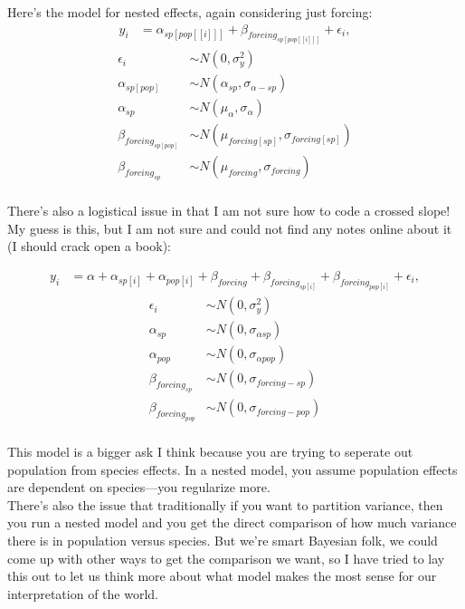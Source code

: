 \documentclass[11pt,letter]{article}
\begin{document}
Here's the model for nested effects, again considering just forcing:
\begin{align*}
y_i &= \alpha_{sp[pop[[i]]]} + \beta_{forcing_{sp[pop[[i]]]}}  + \epsilon_i,
\end{align*}
\begin{align*}
\epsilon_i & \sim N(0,\sigma^2_y) \\
\alpha_{sp[pop]} & \sim N(\alpha_{sp}, \sigma_{\alpha-sp}) \\
\alpha_{sp} & \sim N(\mu_{\alpha}, \sigma_{\alpha}) \\
\beta_{forcing_{sp[pop]}} & \sim N(\mu_{forcing[sp]}, \sigma_{forcing[sp]}) \\
\beta_{forcing_{sp}} & \sim N(\mu_{forcing}, \sigma_{forcing}) \\
\end{align*}

There's also a logistical issue in that I am not sure how to code a crossed slope! My guess is this, but I am not sure and could not find any notes online about it (I should crack open a book):

\begin{align*}
y_i &= \alpha +  \alpha_{sp[i]} + \alpha_{pop[i]} + \beta_{forcing} + \beta_{forcing_{sp[i]}} + \beta_{forcing_{pop[i]}} + \epsilon_i,
\end{align*}
\begin{align*}
\epsilon_i & \sim N(0,\sigma^2_y) \\
\alpha_{sp} & \sim N(0, \sigma_{\alpha sp}) \\
\alpha_{pop} & \sim N(0, \sigma_{\alpha pop}) \\
\beta_{forcing_{sp}} & \sim N(0, \sigma_{forcing-sp}) \\
\beta_{forcing_{pop}} & \sim N(0, \sigma_{forcing-pop}) \\
\end{align*}

This model is a bigger ask I think because you are trying to seperate out population from species effects. In a nested model, you assume population effects are dependent on species---you regularize more. \\ %

There's also the issue that traditionally if you want to partition variance, then you run a nested model and you get the direct comparison of how much variance there is in population versus species. But we're smart Bayesian folk, we could come up with other ways to get the comparison we want, so I have tried to lay this out to let us think more about what model makes the most sense for our interpretation of the world. 
\end{document}
